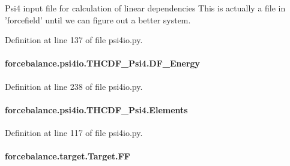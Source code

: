 Psi4 input file for calculation of linear dependencies This is actually a file in 'forcefield' until we can figure out a better system. 



Definition at line 137 of file psi4io.\-py.

\hypertarget{classforcebalance_1_1psi4io_1_1THCDF__Psi4_a5992e04d0a4b8d1e96ad10ec58e7d06a}{
\paragraph[{D\-F\-\_\-\-Energy}]{\setlength{\rightskip}{0pt plus 5cm}forcebalance.\-psi4io.\-T\-H\-C\-D\-F\-\_\-\-Psi4.\-D\-F\-\_\-\-Energy}}\label{classforcebalance_1_1psi4io_1_1THCDF__Psi4_a5992e04d0a4b8d1e96ad10ec58e7d06a}


Definition at line 238 of file psi4io.\-py.

\hypertarget{classforcebalance_1_1psi4io_1_1THCDF__Psi4_affc5bc01af54d89e452f324c78d1bc1c}{
\paragraph[{Elements}]{\setlength{\rightskip}{0pt plus 5cm}forcebalance.\-psi4io.\-T\-H\-C\-D\-F\-\_\-\-Psi4.\-Elements}}\label{classforcebalance_1_1psi4io_1_1THCDF__Psi4_affc5bc01af54d89e452f324c78d1bc1c}


Definition at line 117 of file psi4io.\-py.

\hypertarget{classforcebalance_1_1target_1_1Target_a38a37919783141ea37fdcf8b00ce0aaf}{
\paragraph[{F\-F}]{\setlength{\rightskip}{0pt plus 5cm}forcebalance.\-target.\-Target.\-F\-F\hspace{0.3cm}{\ttfamily [inherited]}}}\label{classforcebalance_1_1target_1_1Target_a38a37919783141ea37fdcf8b00ce0aaf}


